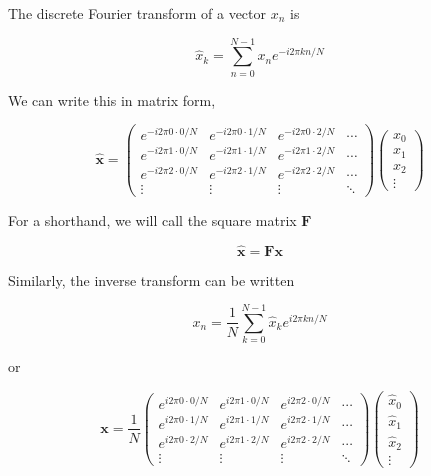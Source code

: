 \documentclass[12pt]{article}
\newcommand{\x}{\mathbf{x}}
\newcommand{\xhat}{\mathbf{\hat x}}
\newcommand{\F}{\mathbf{F}}
\begin{document}
The discrete Fourier transform of a vector $x_n$ is

\begin{equation}
\hat{x}_k = \sum_{n=0}^{N-1} x_n e^{-i 2 \pi k n / N}
\end{equation}

\noindent We can write this in matrix form,

\begin{equation}
\xhat = \left( \begin{array}{cccc}
   e^{-i 2\pi 0 \cdot 0 / N} & e^{-i 2\pi 0\cdot 1 / N} & e^{-i 2\pi 0 \cdot 2 / N} & \cdots \\
   e^{-i 2\pi 1 \cdot 0 / N} & e^{-i 2\pi 1 \cdot1 / N} & e^{-i 2\pi 1 \cdot 2 / N} & \cdots \\
   e^{-i 2\pi 2 \cdot 0 / N} & e^{-i 2\pi 2 \cdot 1 / N} & e^{-i 2\pi 2 \cdot 2 / N} & \cdots \\
   \vdots & \vdots & \vdots & \ddots
   \end{array} \right)
   \left( \begin{array}{c} x_0 \\ x_1 \\ x_2 \\ \vdots \end{array} \right)
\end{equation}

\noindent For a shorthand, we will call the square matrix $\mathbf{F}$

\begin{equation}
\xhat = \F \x
\end{equation}

Similarly, the inverse transform can be written

\begin{equation}
x_n = \frac{1}{N} \sum_{k=0}^{N-1} \hat{x}_k e^{i 2 \pi k n / N}
\end{equation}

\noindent or

\begin{equation}
   \mathbf{x} = \frac{1}{N} \left( \begin{array}{cccc}
   e^{i 2\pi 0 \cdot 0 / N} & e^{i 2\pi 1 \cdot 0 / N} & e^{i 2\pi 2 \cdot 0 / N} & \cdots \\
   e^{i 2\pi 0 \cdot 1 / N} & e^{i 2\pi 1 \cdot 1 / N} & e^{i 2\pi 2 \cdot 1 / N} & \cdots \\
   e^{i 2\pi 0 \cdot 2 / N} & e^{i 2\pi 1 \cdot 2 / N} & e^{i 2\pi 2 \cdot 2 / N} & \cdots \\
   \vdots & \vdots & \vdots & \ddots
   \end{array} \right)
   \left( \begin{array}{c} \hat{x}_0 \\ \hat{x}_1 \\ \hat{x}_2 \\ \vdots \end{array} \right)
\end{equation}
\end{document}
